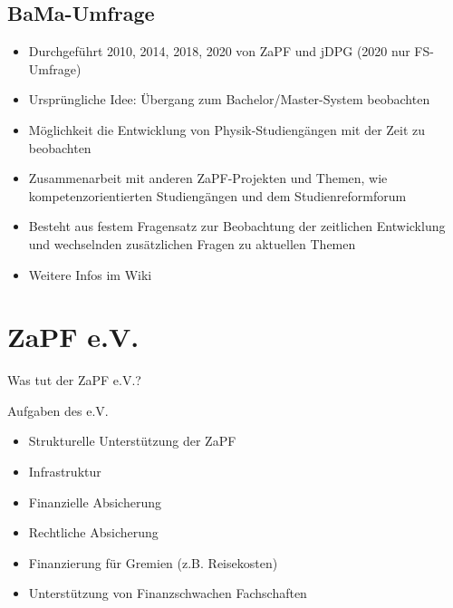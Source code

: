 \documentclass[compress, aspectratio=169]{beamer}
\begin{document}
 \subsection{BaMa-Umfrage}
 \begin{frame}{\insertsubsection}
 	\vspace*{-3mm}
 	\begin{itemize}
 		\item Durchgeführt 2010, 2014, 2018, 2020 von ZaPF und jDPG (2020 nur FS-Umfrage)
 		\item Ursprüngliche Idee: Übergang zum Bachelor/Master-System beobachten
 		\item Möglichkeit die Entwicklung von Physik-Studiengängen mit der Zeit zu beobachten
 		\pause
 		\item Zusammenarbeit mit anderen ZaPF-Projekten und Themen, wie kompetenzorientierten Studiengängen und dem Studienreformforum
 		\item Besteht aus festem Fragensatz zur Beobachtung der zeitlichen Entwicklung und wechselnden zusätzlichen Fragen zu aktuellen Themen
 		\item Weitere Infos im Wiki
 	\end{itemize}
 \end{frame}


\section{ZaPF e.V.}

\begin{frame}{Was tut der ZaPF e.V.?}
  \begin{block}{Aufgaben des e.V.}
    \begin{itemize}
      \item Strukturelle Unterstützung der ZaPF
      \item Infrastruktur
      \item Finanzielle Absicherung
      \item Rechtliche Absicherung
      \item Finanzierung für Gremien (z.B. Reisekosten)
      \item Unterstützung von Finanzschwachen Fachschaften
    \end{itemize}
  \end{block}
\end{frame}
  
\end{document}
